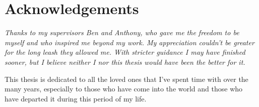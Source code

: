 
\section*{Acknowledgements}

\itshape
Thanks to my supervisors Ben and Anthony, who gave me the freedom to be myself and who  inspired me beyond my work.
My appreciation couldn't be greater for the long leash they allowed me.
With stricter guidance I may have finished sooner, but I believe neither I nor this thesis would have been the better for it.

This thesis is dedicated to all the loved ones that I've spent time with over the many years, especially to those who have come into the world and those who have departed it during this period of my life.
\upshape
